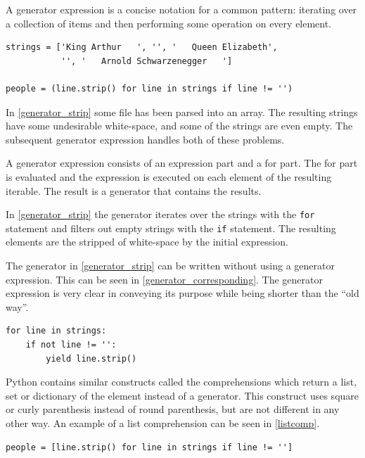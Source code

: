 A generator expression is a concise notation for a common pattern: iterating over a collection of items and then performing some operation on every element\citep{python_functional}.

\begin{minipage}{\linewidth}
\begin{lstlisting}[style=python, caption={Generator expression, stripping white-space from strings}, label={generator_strip}]
strings = ['King Arthur   ', '', '   Queen Elizabeth',
           '', '   Arnold Schwarzenegger   ']

people = (line.strip() for line in strings if line != '')
\end{lstlisting}
\end{minipage}

In \cref{generator_strip} some file has been parsed into an array.
The resulting strings have some undesirable white-space, and some of the strings are even empty.
The subsequent generator expression handles both of these problems.

A generator expression consists of an expression part and a for part.
The for part is evaluated and the expression is executed on each element of the resulting iterable.
The result is a generator that contains the results.

In \cref{generator_strip} the generator iterates over the strings with the \texttt{for} statement and filters out empty strings with the \texttt{if} statement.
The resulting elements are the stripped of white-space by the initial expression.

The generator in \cref{generator_strip} can be written without using a generator expression.
This can be seen in \cref{generator_corresponding}.
The generator expression is very clear in conveying its purpose while being shorter than the ``old way''.

\begin{minipage}{\linewidth}
\begin{lstlisting}[style=python, caption={\Cref{generator_strip} implemented without using an generator expression}, label={generator_corresponding}]
for line in strings:
    if not line != '':
        yield line.strip()
\end{lstlisting}
\end{minipage}

Python contains similar constructs called the comprehensions which return a list, set or dictionary of the element instead of a generator.
This construct uses square or curly parenthesis instead of round parenthesis, but are not different in any other way.
An example of a list comprehension can be seen in \cref{listcomp}.

\begin{minipage}{\linewidth}
\begin{lstlisting}[style=python, caption={The generator from \cref{generator_strip} changed to a list comprehension}, label={listcomp}]
people = [line.strip() for line in strings if line != '']
\end{lstlisting}
\end{minipage}

